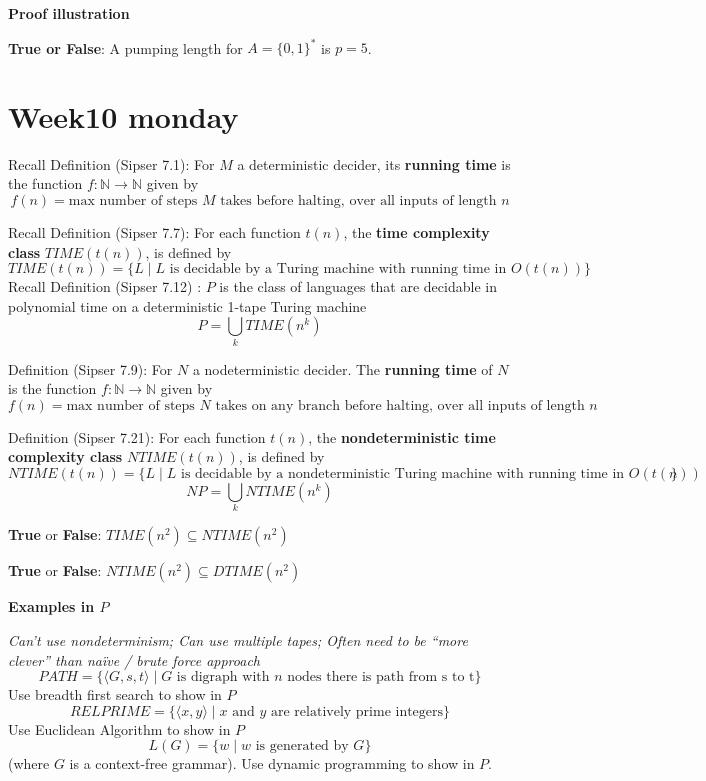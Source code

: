 \documentclass[12pt, oneside]{article}
\begin{document}
{\bf Proof illustration}


\vfill




{\bf True or False}: A pumping length for $A = \{ 0,1 \}^*$ is $p = 5$.

\vspace{50pt} \vfill
\section*{Week10 monday}


Recall Definition  (Sipser 7.1): For  $M$ a deterministic decider, its {\bf running time} is the function  $f: \mathbb{N} \to \mathbb{N}$
given  by
\[
f(n) =  \text{max number of  steps $M$ takes before halting, over all inputs  of length $n$}
\]

Recall Definition (Sipser 7.7): For each function $t(n)$, the {\bf time complexity class}  $TIME(t(n))$, is defined  by
\[
TIME( t(n)) = \{ L \mid \text{$L$ is decidable by  a Turing machine with running time in  $O(t(n))$} \}
\]
Recall Definition (Sipser 7.12) : $P$ is the class of languages that  are decidable in polynomial time on 
a deterministic 1-tape  Turing  machine
\[
P  =  \bigcup_k TIME(n^k)
\]

Definition (Sipser  7.9): For $N$ a nodeterministic decider.  
The {\bf running time} of $N$ is the function $f: \mathbb{N} \to \mathbb{N}$ given  by
\[
f(n) =  \text{max number of  steps $N$ takes on  any branch before halting, over all inputs  of length $n$}
\]

Definition (Sipser 7.21): For each function $t(n)$, the {\bf nondeterministic time complexity class}  
$NTIME(t(n))$, is defined  by
\[
NTIME( t(n)) = \{ L \mid \text{$L$ is decidable by a nondeterministic Turing machine with running time in $O(t(n))$} \}
\]
\[
NP = \bigcup_k NTIME(n^k)
\]


{\bf True} or {\bf False}: $TIME(n^2) \subseteq NTIME(n^2)$

\vfill

{\bf True} or {\bf False}: $NTIME(n^2) \subseteq DTIME(n^2)$

\vfill
\newpage

{\bf Examples in $P$ }

{\it Can't use nondeterminism; Can use multiple tapes; Often need to be “more clever” than naïve / brute force approach}
\[
    PATH = \{\langle G,s,t\rangle \mid \textrm{$G$ is digraph with $n$ nodes there is path from s to t}\}
\]
Use breadth first search to show in $P$
\[
    RELPRIME = \{ \langle x,y\rangle \mid \textrm{$x$ and $y$ are relatively prime integers}\}
\]
Use Euclidean Algorithm to show in $P$
\[
    L(G) = \{w \mid \textrm{$w$ is generated by $G$}\} 
\]
(where $G$ is a context-free grammar). Use dynamic programming to show in $P$.
\end{document}
